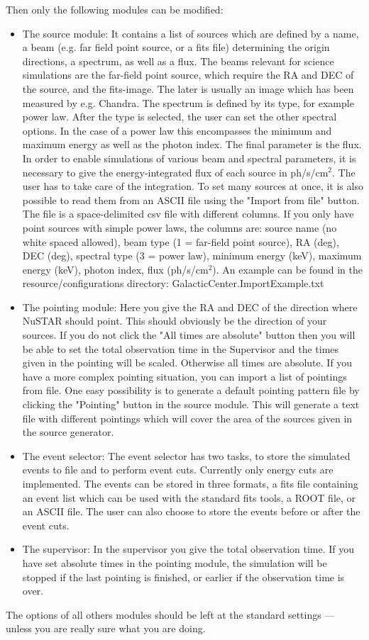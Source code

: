 Then only the following modules can be modified:
\begin{itemize}
\item The source module: 
It contains a list of sources which are defined by a name, a beam (e.g. far field point source, or a fits file) determining the origin directions, a spectrum, as well as a flux.
The beams relevant for science simulations are the far-field point source, which require the RA and DEC of the source, and the fits-image. The later is usually an image which has been measured by e.g. Chandra.
The spectrum is defined by its type, for example power law. 
After the type is selected, the user can set the other spectral options.
In the case of a power law this encompasses the minimum and maximum energy as well as the photon index.
The final parameter is the flux.
In order to enable simulations of various beam and spectral parameters, it is necessary to give the energy-integrated flux of each source in ph/s/cm$^2$. 
The user has to take care of the integration.
To set many sources at once, it is also possible to read them from an ASCII file using the "Import from file" button. 
The file is a space-delimited csv file with different columns. If you only have point sources with simple power laws, the columns are: source name (no white spaced allowed), beam type (1 = far-field point source), RA (deg), DEC (deg), spectral type (3 = power law), minimum energy (keV), maximum energy (keV), photon index, flux (ph/s/cm$^2$).
An example can be found in the resource/configurations directory: GalacticCenter.ImportExample.txt
\item The pointing module: 
Here you give the RA and DEC of the direction where NuSTAR should point. 
This should obviously be the direction of your sources.
If you do not click the "All times are absolute" button then you will be able to set the total observation time in the Supervisor and the times given in the pointing will be scaled.
Otherwise all times are absolute. 
If you have a more complex pointing situation, you can import a list of pointings from file.
One easy possibility is to generate a default pointing pattern file by clicking the "Pointing" button in the source module. 
This will generate a text file with different pointings which will cover the area of the sources given in the source generator.
\item The event selector:
The event selector has two tasks, to store the simulated events to file and to perform event cuts.
Currently only energy cuts are implemented.
The events can be stored in three formats, a fits file containing an event list which can be used with the standard fits tools, a ROOT file, or an ASCII file.
The user can also choose to store the events before or after the event cuts.
\item The supervisor:
In the supervisor you give the total observation time. 
If you have set absolute times in the pointing module, the simulation will be stopped if the last pointing is finished, or earlier if the observation time is over. 
\end{itemize}
The options of all others modules should be left at the standard settings --- unless you are really sure what you are doing.


